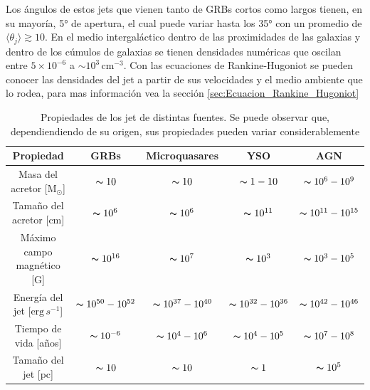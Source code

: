 \documentclass[12pt,a4paper]{book}
\begin{document}
Los ángulos de estos jets que vienen tanto de GRBs cortos como largos tienen, en su mayoría, 5° de apertura, el cual puede variar hasta los 35° con un promedio de 
$\langle \theta_j \rangle \gtrsim 10$.
En el medio intergaláctico dentro de las proximidades de las galaxias y dentro de los cúmulos de galaxias se tienen densidades numéricas que oscilan entre $5 \times 10^{-6}$ a 
$ \sim 10^3 \, \text{cm}^{-3}$. Con las ecuaciones de Rankine-Hugoniot se pueden conocer las densidades del jet a partir de sus velocidades y el medio ambiente que lo rodea, para mas información 
vea la sección \ref{sec:Ecuacion_Rankine_Hugoniot}



\begin{table}
  \begin{center}
    \begin{tabular}{ c c c c c } 
      \hline
      Propiedad                                   & GRBs                          & Microquasares                    & YSO                            & AGN                 \\
      \hline
      Masa del acretor [$\text{M}_{\odot }$]      & $\thicksim 10$                &    $\thicksim 10$                &  $\thicksim 1-10$              & $\thicksim 10^{6}-10^{9}$                       \\ 
      Tamaño del acretor [cm]                     & $\thicksim 10^{6}$            &    $\thicksim 10^{6}$            &  $\thicksim 10^{11}$           & $\thicksim 10^{11}-10^{15}$                      \\ 
      Máximo campo magnético [G]                  & $\thicksim 10^{16}$           &    $\thicksim 10^{7}$            &  $\thicksim 10^{3}$            & $\thicksim 10^{3}-10^{5}$                         \\ 
      Energía del jet [$\text{erg} \, s^{-1}$]    & $\thicksim 10^{50}-10^{52}$   &    $\thicksim 10^{37}-10^{40}$   &  $\thicksim 10^{32}-10^{36}$   & $\thicksim 10^{42}-10^{46}$                        \\ 
      Tiempo de vida [años]                       & $\thicksim 10^{-6}$           &    $\thicksim 10^{4}-10^{6}$     &  $\thicksim 10^{4}-10^{5}$     & $\thicksim 10^{7}-10^{8}$                           \\ 
      Tamaño del jet [pc]                         & $\thicksim 10$                &    $\thicksim 10$                &  $\thicksim 1$                 & $\thicksim 10^{5}$                                   \\ 
    \end{tabular}
  \caption{Propiedades de los jet de distintas fuentes. Se puede observar que, dependiendiendo de su origen, sus propiedades pueden variar considerablemente} \label{table:propiedades_jets}
  \end{center}

\end{table}
  
\end{document}
